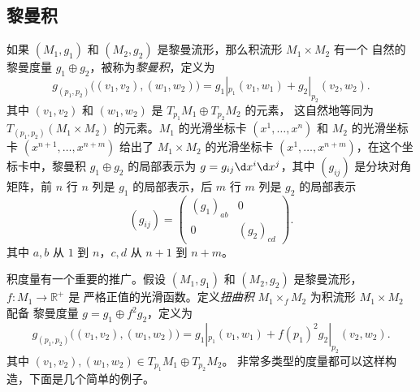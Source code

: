 \subsection{黎曼积}

如果 $(M_1,g_1)$ 和 $(M_2,g_2)$ 是黎曼流形，那么积流形 $M_1\times M_2$ 有一个
自然的黎曼度量 $g_1\oplus g_2$，被称为\emph{黎曼积}，定义为
\begin{equation}
  g_{(p_1,p_2)}\bigl((v_1,v_2),(w_1,w_2)\bigr)=g_{1}|_{p_1}(v_1,w_1)+g_{2}|_{p_2}(v_2,w_2).
\end{equation}
其中 $(v_1,v_2)$ 和 $(w_1,w_2)$ 是 $T_{p_1}M_1\oplus T_{p_2}M_2$ 的元素，
这自然地等同为 $T_{(p_1,p_2)}(M_1\times M_2)$ 的元素。$M_1$ 的光滑坐标卡
$(x^1,\dots,x^n)$ 和 $M_2$ 的光滑坐标卡 $(x^{n+1},\dots,x^{n+m})$
给出了 $M_1\times M_2$ 的光滑坐标卡 $(x^1,\dots,x^{n+m})$，在这个坐标卡中，黎曼积
$g_1\oplus g_2$ 的局部表示为 $g=g_{ij}\d x^i\d x^j$，其中 $(g_{ij})$ 是分块对角矩阵，前 $n$ 行 $n$ 列是 $g_1$ 的局部表示，后 $m$ 行 $m$ 列是 $g_2$ 的局部表示
\[
  (g_{ij})=
  \begin{pmatrix}
    (g_1)_{ab} & 0\\
    0 & (g_2)_{cd}
  \end{pmatrix}.
\]
其中 $a,b$ 从 $1$ 到 $n$，$c,d$ 从 $n+1$ 到 $n+m$。

积度量有一个重要的推广。假设 $(M_1,g_1)$ 和 $(M_2,g_2)$ 是黎曼流形，$f:M_1\to \mathbb{R}^+$ 是
严格正值的光滑函数。定义\emph{扭曲积} $M_1\times_f M_2$ 为积流形 $M_1\times M_2$ 配备
黎曼度量 $g=g_1\oplus f^2 g_2$，定义为
\[
  g_{(p_1,p_2)}\bigl((v_1,v_2),(w_1,w_2)\bigr)=g_{1}|_{p_1}(v_1,w_1)+f(p_1)^2 g_{2}|_{p_2}(v_2,w_2).
\]
其中 $(v_1,v_2),(w_1,w_2)\in T_{p_1}M_1\oplus T_{p_2}M_2$。
非常多类型的度量都可以这样构造，下面是几个简单的例子。

